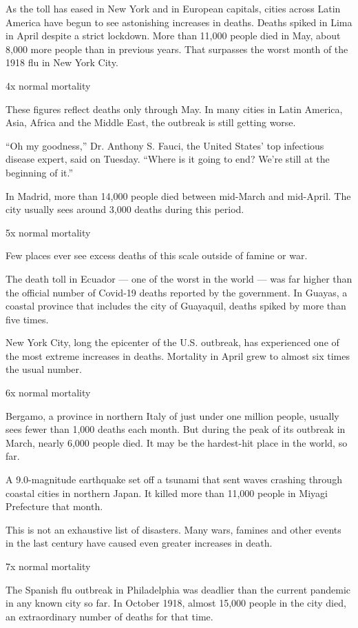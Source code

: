 As the toll has eased in New York and in European capitals, cities
across Latin America have begun to see astonishing increases in deaths.
Deaths spiked in Lima in April despite a strict lockdown. More than
11,000 people died in May, about 8,000 more people than in previous
years. That surpasses the worst month of the 1918 flu in New York City.

4x normal mortality

These figures reflect deaths only through May. In many cities in Latin
America, Asia, Africa and the Middle East, the outbreak is still getting
worse.

``Oh my goodness,'' Dr. Anthony S. Fauci, the United States' top
infectious disease expert, said on Tuesday. ``Where is it going to end?
We're still at the beginning of it.''

In Madrid, more than 14,000 people died between mid-March and mid-April.
The city usually sees around 3,000 deaths during this period.

5x normal mortality

Few places ever see excess deaths of this scale outside of famine or
war.

The death toll in Ecuador --- one of the worst in the world --- was far
higher than the official number of Covid-19 deaths reported by the
government. In Guayas, a coastal province that includes the city of
Guayaquil, deaths spiked by more than five times.

New York City, long the epicenter of the U.S. outbreak, has experienced
one of the most extreme increases in deaths. Mortality in April grew to
almost six times the usual number.

6x normal mortality

Bergamo, a province in northern Italy of just under one million people,
usually sees fewer than 1,000 deaths each month. But during the peak of
its outbreak in March, nearly 6,000 people died. It may be the
hardest-hit place in the world, so far.

A 9.0-magnitude earthquake set off a tsunami that sent waves crashing
through coastal cities in northern Japan. It killed more than 11,000
people in Miyagi Prefecture that month.

This is not an exhaustive list of disasters. Many wars, famines and
other events in the last century have caused even greater increases in
death.

7x normal mortality

The Spanish flu outbreak in Philadelphia was deadlier than the current
pandemic in any known city so far. In October 1918, almost 15,000 people
in the city died, an extraordinary number of deaths for that time.

